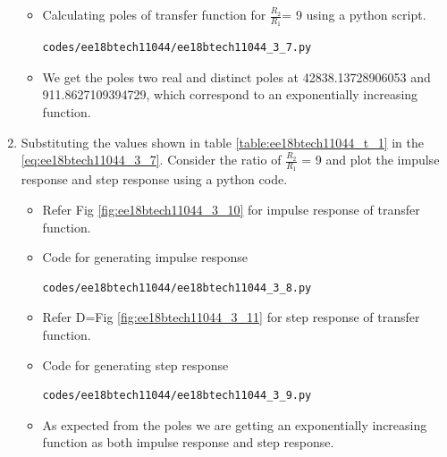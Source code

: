 \begin{enumerate}[label=\arabic*.,ref=\theenumi]
\solution

\begin{itemize}
\item Calculating poles of transfer function for $\frac{R_2}{R_1}$= 9 using a python script.
\begin{lstlisting}
codes/ee18btech11044/ee18btech11044_3_7.py
\end{lstlisting}
\item We get the poles two real and distinct poles at 42838.13728906053  and  911.8627109394729, which correspond to an exponentially increasing function.  
\end{itemize}

\item Substituting the values shown in table \ref{table:ee18btech11044_t_1} in the   \eqref{eq:ee18btech11044_3_7}. Consider the ratio of $\frac{R_2}{R_1}$ = 9 and plot the impulse response and step response using a python code.

\solution

\begin{itemize}
\item Refer Fig \ref{fig:ee18btech11044_3_10} for impulse response of transfer function.
\item Code for generating impulse response
\begin{lstlisting}
codes/ee18btech11044/ee18btech11044_3_8.py
\end{lstlisting}
\item Refer D=Fig \ref{fig:ee18btech11044_3_11} for step response of transfer function.
\item Code for generating step response
\begin{lstlisting}
codes/ee18btech11044/ee18btech11044_3_9.py
\end{lstlisting}
\item As expected from the poles we are getting an exponentially increasing function as both impulse response and step response.
\end{itemize}


\end{enumerate}
